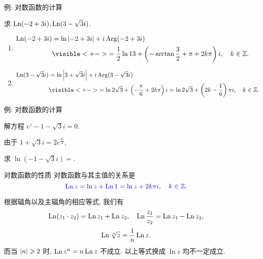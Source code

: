 \begin{frame}{例: 对数函数的计算}
	\beqskip{5pt}
	\onslide<+->
	\begin{example}
	求 $\operatorname{Ln}(-2+3i),\operatorname{Ln}(3-\sqrt3 i)$.
	\end{example}

	\onslide<+->
	\begin{solution}
		\begin{enumerate}
			\item
			\begin{align*}
				\Ln(-2+3i)&=\ln\abs{-2+3i}+i\Arg(-2+3i)\\
				&\visible<+->{=\frac 12\ln 13+\left(-\arctan\frac 32+\pi+2k\pi\right)i,\quad k\in\BZ.}
			\end{align*}
			\item
			\begin{align*}
				\Ln(3-\sqrt3i)&=\ln\abs{3+\sqrt 3i}+i\Arg(3-\sqrt 3i)\\
				&\visible<+->{=\ln 2\sqrt 3+\left(-\frac\pi6+2k\pi\right)i
				=\ln 2\sqrt 3+\left(2k-\frac16\right)\pi i,\quad k\in\BZ.}
			\end{align*}
		\end{enumerate}
		\vspace{-.5\baselineskip}
	\end{solution}
	\endgroup
\end{frame}


\begin{frame}{例: 对数函数的计算}
	\onslide<+->
	\begin{example}
		解方程 $e^z-1-\sqrt 3i=0$.
	\end{example}

	\onslide<+->
	\begin{solution}
		由于 $1+\sqrt 3 i=2e^{\frac{\pi i}3}$,
		\onslide<+->{因此
		\[z=\Ln(1+\sqrt 3i)=\ln 2+\left(2k+\frac13\right)\pi i,\quad k\in\BZ.\]}
		\vspace{-\baselineskip}
	\end{solution}

	\onslide<+->
	\begin{exercise}
		求 $\ln(-1-\sqrt3 i)=$\fillblank[2cm]{\visible<+->{$\ln 2-2\pi i/3$}}.
	\end{exercise}
\end{frame}


\begin{frame}{对数函数的性质}
	\onslide<+->
	对数函数与其主值的关系是
	\[\emph{\Ln z=\ln z+\Ln 1=\ln z+2k\pi i,\quad k\in\BZ}.\]

	\onslide<+->
	根据辐角以及主辐角的相应等式, 我们有
	\[\operatorname{Ln}(z_1\cdot z_2)=\operatorname{Ln} z_1+\operatorname{Ln} z_2,\quad
	\operatorname{Ln}\frac{z_1}{z_2}=\operatorname{Ln} z_1-\operatorname{Ln} z_2,\]
	\[\operatorname{Ln} \sqrt[n]z=\dfrac1n\operatorname{Ln} z.\]
	\onslide<+->
	而当 $\left|n\right|\geqslant 2$ 时, \alert{$\operatorname{Ln} z^n=n\operatorname{Ln} z$ 不成立}.
	\onslide<+->
	以上等式换成 $\ln z$ 均不一定成立.
\end{frame}


